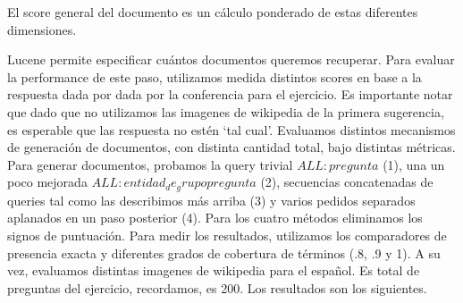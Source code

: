 El score general del documento es un cálculo ponderado de estas diferentes dimensiones. 

Lucene permite especificar cuántos documentos queremos recuperar. Para evaluar la performance de este paso, utilizamos medida distintos scores en base a la respuesta dada por dada por la conferencia para el ejercicio. Es importante notar que dado que no utilizamos las imagenes de wikipedia de la primera sugerencia, es esperable que las respuesta no estén `tal cual'. 
Evaluamos distintos mecanismos de generación de documentos, con distinta cantidad total, bajo distintas métricas. Para generar documentos, probamos la query trivial $ALL: pregunta$ (1), una un poco mejorada $ALL: entidad_de_grupo pregunta$ (2), secuencias concatenadas de queries tal como las describimos más arriba (3) y varios pedidos separados aplanados en un paso posterior (4). Para los cuatro métodos eliminamos los signos de puntuación. Para medir los resultados, utilizamos los comparadores de presencia exacta y diferentes grados de cobertura de términos (.8, .9 y 1). A su vez, evaluamos distintas imagenes de wikipedia para el español. Es total de preguntas del ejercicio, recordamos, es 200. Los resultados son los siguientes.


